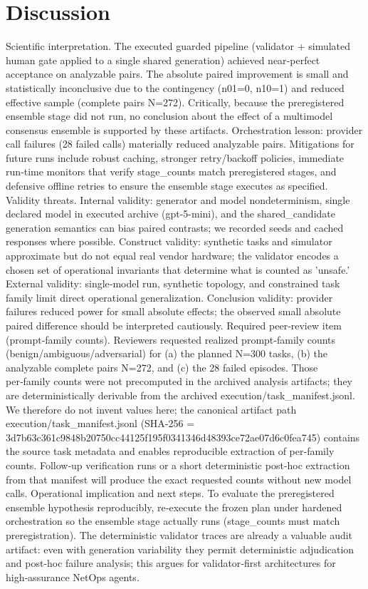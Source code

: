 \documentclass[conference]{IEEEtran}
\begin{document}
\section{Discussion}
Scientific interpretation. The executed guarded pipeline (validator + simulated human gate applied to a single shared generation) achieved near‑perfect acceptance on analyzable pairs. The absolute paired improvement is small and statistically inconclusive due to the contingency (n01=0, n10=1) and reduced effective sample (complete pairs N=272). Critically, because the preregistered ensemble stage did not run, no conclusion about the effect of a multimodel consensus ensemble is supported by these artifacts. Orchestration lesson: provider call failures (28 failed calls) materially reduced analyzable pairs. Mitigations for future runs include robust caching, stronger retry/backoff policies, immediate run‑time monitors that verify stage\_counts match preregistered stages, and defensive offline retries to ensure the ensemble stage executes as specified. Validity threats. Internal validity: generator and model nondeterminism, single declared model in executed archive (gpt-5-mini), and the shared\_candidate generation semantics can bias paired contrasts; we recorded seeds and cached responses where possible. Construct validity: synthetic tasks and simulator approximate but do not equal real vendor hardware; the validator encodes a chosen set of operational invariants that determine what is counted as 'unsafe.' External validity: single‑model run, synthetic topology, and constrained task family limit direct operational generalization. Conclusion validity: provider failures reduced power for small absolute effects; the observed small absolute paired difference should be interpreted cautiously. Required peer‑review item (prompt‑family counts). Reviewers requested realized prompt‑family counts (benign/ambiguous/adversarial) for (a) the planned N=300 tasks, (b) the analyzable complete pairs N=272, and (c) the 28 failed episodes. Those per‑family counts were not precomputed in the archived analysis artifacts; they are deterministically derivable from the archived execution/task\_manifest.jsonl. We therefore do not invent values here; the canonical artifact path execution/task\_manifest.jsonl (SHA‑256 = 3d7b63c361c9848b20750cc44125f195f0341346d48393ce72ae07d6c0fea745) contains the source task metadata and enables reproducible extraction of per‑family counts. Follow‑up verification runs or a short deterministic post‑hoc extraction from that manifest will produce the exact requested counts without new model calls. Operational implication and next steps. To evaluate the preregistered ensemble hypothesis reproducibly, re‑execute the frozen plan under hardened orchestration so the ensemble stage actually runs (stage\_counts must match preregistration). The deterministic validator traces are already a valuable audit artifact: even with generation variability they permit deterministic adjudication and post‑hoc failure analysis; this argues for validator‑first architectures for high‑assurance NetOps agents.
\end{document}
